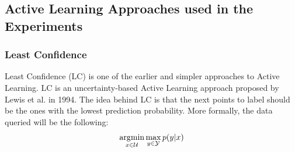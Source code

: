 \subsection{Active Learning Approaches used in the Experiments}
\label{sec:Related_work:Active_Learning:Approaches}
\subsubsection{Least Confidence}
Least Confidence (LC) is one of the earlier and simpler approaches to Active Learning. LC is an uncertainty-based Active Learning
approach proposed by Lewis et al. \cite{lewis1994sequential} in 1994. The idea behind LC is that the next points to label should be the 
ones with the lowest prediction probability. More formally, the data queried will be the following:
\begin{equation}
    \operatorname*{\arg\!\min}_{x \in \mathcal{U}} \max_{y \in \mathcal{Y}} p(y|x)
\end{equation}
